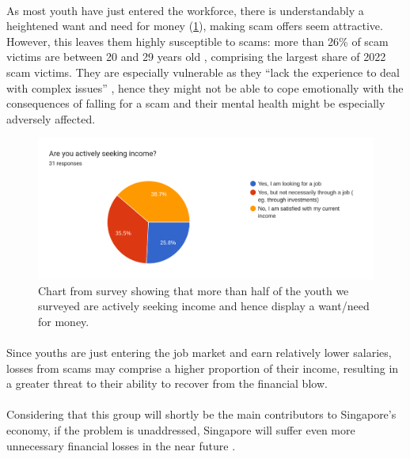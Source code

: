 \documentclass[a4paper]{article}
\begin{document}
\paragraph{} As most youth have just entered the workforce, there is
understandably a heightened want and need for money (\cref{fig:incomegraph}),
making scam offers seem attractive. However, this leaves them highly susceptible
to scams: more than 26\% of scam victims are between 20 and 29 years old
\parencite{Chua.2023}, comprising the largest share of 2022 scam victims. They
are especially vulnerable as they ``lack the experience to deal with complex
issues'' \parencite{SiowDivi.2023}, hence they might not be able to cope
emotionally with the consequences of falling for a scam and their mental health
might be especially adversely affected.

\begin{figure}[ht]
  \centering \includegraphics[width=\textwidth]{incomegraph}
  \caption{Chart from survey showing that more than half of the youth we
    surveyed are actively seeking income and hence display a want/need for
    money.}\label{fig:incomegraph}
\end{figure}

\paragraph{} Since youths are just entering the job market and earn relatively
lower salaries, losses from scams may comprise a higher proportion of their
income, resulting in a greater threat to their ability to recover from the
financial blow.

\paragraph{} Considering that this group will shortly be the main contributors
to Singapore’s economy, if the problem is unaddressed, Singapore will suffer
even more unnecessary financial losses in the near future
\parencite{SiowDivi.2023}.
\end{document}
